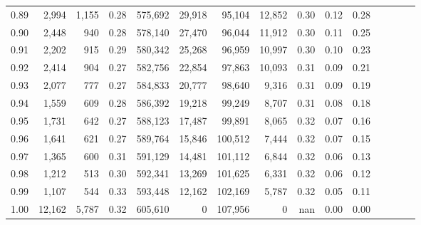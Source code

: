 \begin{tabular}{rrrcrrrrrrrrrrr}
0.89 &   2,994 &  1,155 &                                       0.28 &  575,692 &   29,918 &   95,104 &   12,852 &  0.30 &  0.12 &                         0.28 \\
0.90 &   2,448 &    940 &                                       0.28 &  578,140 &   27,470 &   96,044 &   11,912 &  0.30 &  0.11 &                         0.25 \\
0.91 &   2,202 &    915 &                                       0.29 &  580,342 &   25,268 &   96,959 &   10,997 &  0.30 &  0.10 &                         0.23 \\
0.92 &   2,414 &    904 &                                       0.27 &  582,756 &   22,854 &   97,863 &   10,093 &  0.31 &  0.09 &                         0.21 \\
0.93 &   2,077 &    777 &                                       0.27 &  584,833 &   20,777 &   98,640 &    9,316 &  0.31 &  0.09 &                         0.19 \\
0.94 &   1,559 &    609 &                                       0.28 &  586,392 &   19,218 &   99,249 &    8,707 &  0.31 &  0.08 &                         0.18 \\
0.95 &   1,731 &    642 &                                       0.27 &  588,123 &   17,487 &   99,891 &    8,065 &  0.32 &  0.07 &                         0.16 \\
0.96 &   1,641 &    621 &                                       0.27 &  589,764 &   15,846 &  100,512 &    7,444 &  0.32 &  0.07 &                         0.15 \\
0.97 &   1,365 &    600 &                                       0.31 &  591,129 &   14,481 &  101,112 &    6,844 &  0.32 &  0.06 &                         0.13 \\
0.98 &   1,212 &    513 &                                       0.30 &  592,341 &   13,269 &  101,625 &    6,331 &  0.32 &  0.06 &                         0.12 \\
0.99 &   1,107 &    544 &                                       0.33 &  593,448 &   12,162 &  102,169 &    5,787 &  0.32 &  0.05 &                         0.11 \\
1.00 &  12,162 &  5,787 &                                       0.32 &  605,610 &        0 &  107,956 &        0 &   nan &  0.00 &                         0.00 \\
\bottomrule
\end{tabular}

